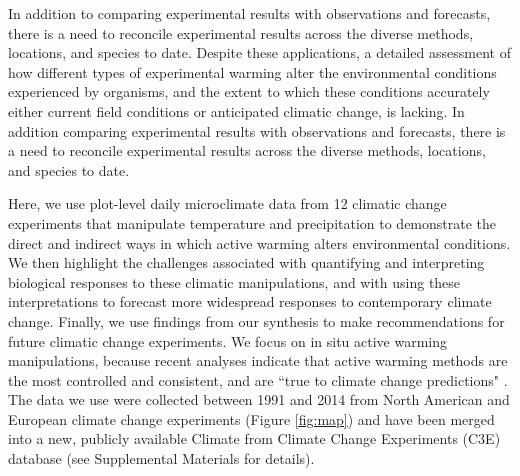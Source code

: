 \documentclass{article}
\begin{document}
In addition to comparing experimental results with observations and forecasts, there is a need to reconcile experimental results across the diverse methods, locations, and species to date.%
Despite these applications, a detailed  assessment of how different types of experimental warming alter the environmental conditions experienced by organisms, and the extent to which these conditions accurately either current field conditions or anticipated climatic change, is lacking.  In addition comparing experimental results with observations and forecasts, there is a need to reconcile experimental results across the diverse methods, locations, and species to date. 

\par Here, we use  plot-level daily  microclimate  data  from  12 climatic  change  experiments  that  manipulate temperature and precipitation to demonstrate the direct and indirect ways in which active warming alters environmental conditions. We then highlight the challenges associated with quantifying and interpreting biological responses to these climatic manipulations, and with using these interpretations to forecast  more widespread responses to contemporary climate change. Finally,  we use findings from our synthesis to make recommendations for future  climatic  change experiments.  We focus on in situ active warming  manipulations, because recent analyses indicate that active warming methods are the most controlled and consistent, and are ``true to climate change predictions" \citep{kimball2005,kimball2008,aronson2009,wolkovich2012}. The data we use were collected between 1991 and 2014 from North American and European climate change experiments (Figure \ref{fig:map}) and  have been merged into a new, publicly  available  Climate from Climate Change Experiments (C3E) database (see Supplemental Materials  for details). 

\end{document}
